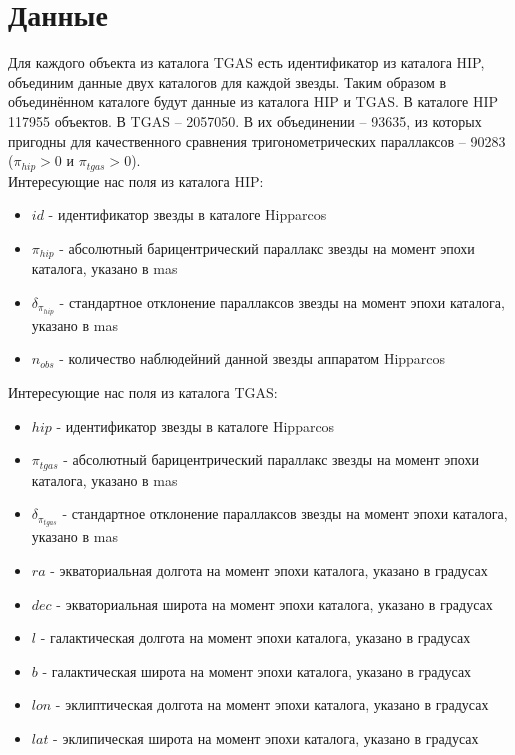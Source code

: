 \documentclass[14pt]{article} %
\begin{document}
\section{Данные}\label{sub:smthzd}
Для каждого объекта из каталога TGAS есть идентификатор из каталога HIP, объединим данные двух каталогов для каждой звезды. Таким образом в объединённом каталоге будут данные из каталога HIP и TGAS. В каталоге HIP 117955 объектов. В TGAS -- 2057050. В их объединении -- 93635, из которых пригодны для качественного сравнения тригонометрических параллаксов -- 90283 ($\pi_{hip} > 0$ и $\pi_{tgas}>0$).
\\

Интересующие нас поля из каталога HIP:
\begin{itemize}
\item $id$ - идентификатор звезды в каталоге Hipparcos

\item $\pi_{hip}$ - абсолютный барицентрический параллакс звезды на момент эпохи каталога, указано в mas

\item $\delta_{\pi_{hip}}$ - стандартное отклонение параллаксов звезды на момент эпохи каталога, указано в mas

\item $n_{obs}$ - количество наблюдейний данной звезды аппаратом Hipparcos\\

\end{itemize}


Интересующие нас поля из каталога TGAS:

\begin{itemize}

\item $hip$ - идентификатор звезды в каталоге Hipparcos

\item $\pi_{tgas}$ - абсолютный барицентрический параллакс звезды на момент эпохи каталога, указано в mas

\item $\delta_{\pi_{tgas}}$ - стандартное отклонение параллаксов звезды на момент эпохи каталога, указано в mas

\item $ra$ - экваториальная долгота на момент эпохи каталога, указано в градусах

\item $dec$ - экваториальная широта на момент эпохи каталога, указано в градусах

\item $l$ - галактическая долгота на момент эпохи каталога, указано в градусах

\item $b$ - галактическая широта на момент эпохи каталога, указано в градусах

\item $lon$ - эклиптическая долгота на момент эпохи каталога, указано в градусах

\item $lat$ - эклипическая широта на момент эпохи каталога, указано в градусах

\end{itemize}
\end{document}
